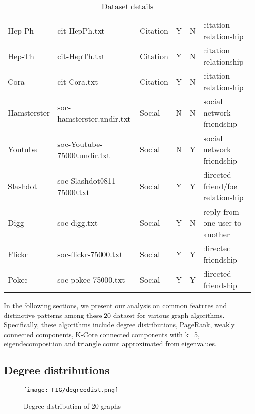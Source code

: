 \begin{table}[H]
\begin{center}
\begin{tabular}{llllll}
Hep-Ph         & cit-HepPh.txt                & Citation      & Y        & N       & citation relationship                  \\
Hep-Th         & cit-HepTh.txt                & Citation      & Y        & N       & citation relationship                  \\
Cora           & cit-Cora.txt                 & Citation      & Y        & N       & citation relationship                  \\
Hamsterster    & soc-hamsterster.undir.txt    & Social        & N        & N       & social network friendship              \\
Youtube        & soc-Youtube-75000.undir.txt  & Social        & N        & Y       & social network friendship              \\
Slashdot       & soc-Slashdot0811-75000.txt   & Social        & Y        & Y       & directed friend/foe relationship       \\
Digg           & soc-digg.txt                 & Social        & Y        & N       & reply from one user to another         \\
Flickr         & soc-flickr-75000.txt         & Social        & Y        & Y       & directed friendship                    \\
Pokec          & soc-pokec-75000.txt          & Social        & Y        & Y       & directed friendship                    \\ \hline
\end{tabular}
\caption{Dataset details}
\end{center}
\end{table}

In the following sections, we present our analysis on common features and distinctive patterns among these 20 dataset for various graph algorithms. Specifically, these algorithms include degree distributions, PageRank, weakly connected components, K-Core connected components with k=5, eigendecomposition and triangle count approximated from eigenvalues.

\subsection{Degree distributions}
\begin{figure}[H]
\begin{center}
\texttt{[image: FIG/degreedist.png]}
\caption{Degree distribution of 20 graphs}
\end{center}
\end{figure}

